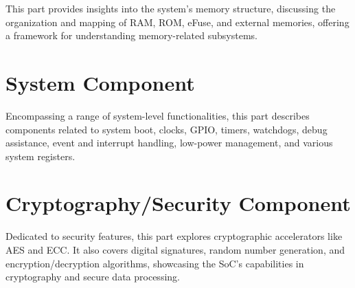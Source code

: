 \documentclass[openany, 10pt]{book}
\begin{document}
This part provides insights into the system's memory structure, discussing the organization and mapping of RAM, ROM, eFuse, and external memories, offering a framework for understanding memory-related subsystems.


\part{System Component}


Encompassing a range of system-level functionalities, this part describes components related to system boot, clocks, GPIO, timers, watchdogs, debug assistance, event and interrupt handling, low-power management, and various system registers.


\part{Cryptography/Security Component}

Dedicated to security features, this part explores cryptographic accelerators like AES and ECC. It also covers digital signatures, random number generation, and encryption/decryption algorithms, showcasing the SoC's capabilities in cryptography and secure data processing.


\end{document}
